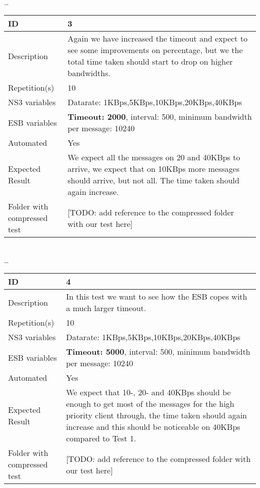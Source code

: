 \begin{center}
\\ \ldots \\

\begin{tabular}{| p{4cm} | p{8cm} |}%
	\hline
	ID & 3 \\
	\hline
	Description & Again we have increased the timeout and expect to see some improvements on percentage, but we the total time taken should start to drop on higher bandwidths.  \\
	\hline
	Repetition(s) & 10 \\
	\hline
	NS3 variables & Datarate: 1KBps,5KBps,10KBps,20KBps,40KBps \\
	\hline
	ESB variables & \textbf{Timeout: 2000}, interval: 500, minimum bandwidth per message: 10240 \\
	\hline
	Automated & Yes \\
	\hline
	Expected Result & We expect all the messages on 20 and 40KBps to arrive, we expect that on 10KBps more messages should arrive, but not all. The time taken should again increase. \\
	\hline
	Folder with compressed test & [TODO: add reference to the compressed folder with our test here]\\
	\hline
\end{tabular}

\\ \ldots \\

\begin{tabular}{| p{4cm} | p{8cm} |}%
	\hline
	ID & 4 \\
	\hline
	Description & In this test we want to see how the ESB copes with a much larger timeout.  \\
	\hline
	Repetition(s) & 10 \\
	\hline
	NS3 variables & Datarate: 1KBps,5KBps,10KBps,20KBps,40KBps \\
	\hline
	ESB variables & \textbf{Timeout: 5000}, interval: 500, minimum bandwidth per message: 10240 \\
	\hline
	Automated & Yes \\
	\hline
	Expected Result & We expect that 10-, 20- and 40KBps should be enough to get most of the messages for the high priority client through, the time taken should again increase and this should be noticeable on 40KBps compared to Test 1.  \\
	\hline
	Folder with compressed test & [TODO: add reference to the compressed folder with our test here]\\
	\hline
\end{tabular}


\end{center}
